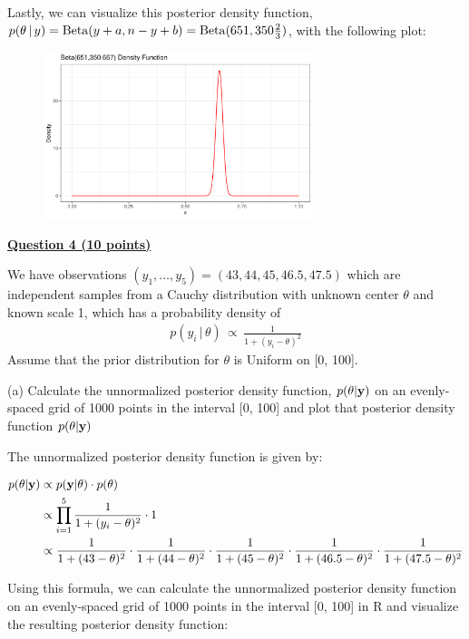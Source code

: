 \documentclass[12pt]{article}
\def\by{{\rm {\bf{y}}}}
\begin{document}
Lastly, we can visualize this posterior density function, $p(\theta \, | \, y) = {\rm Beta}(y + a, n - y + b) = {\rm Beta}(651, 350\frac{2}{3})$,
with the following plot:

\begin{figure}[h]
    \centering
    \includegraphics[width=0.7\textwidth]{q3b_plot.pdf}
\end{figure}

\bigskip

{\underline{\bf Question 4 (10 points)}}  

We have observations $(y_1,\ldots,y_5) = (43, 44, 45, 46.5, 47.5)$ which are independent samples from a Cauchy distribution with unknown center $\theta$ and known scale 1, which has a probability density of 
\begin{eqnarray*}
p(y_i \, | \, \theta) \, \propto \, \frac{1}{1 + (y_i - \theta)^2} 
\end{eqnarray*}
Assume that the prior distribution for $\theta$ is Uniform on [0, 100].  

(a) Calculate the unnormalized posterior density function, $p(\theta | \by)$ on an evenly-spaced grid of 1000 points in the interval [0, 100] and plot that posterior density function $p(\theta | \by)$

The unnormalized posterior density function is given by:

\begin{align*}
p(\theta | \by) &\propto p(\by | \theta) \cdot p(\theta) \\
&\propto \prod_{i=1}^5 \frac{1}{1 + (y_i - \theta)^2} \cdot 1 \\
&\propto \frac{1}{1 + (43 - \theta)^2} \cdot \frac{1}{1 + (44 - \theta)^2} \cdot \frac{1}{1 + (45 - \theta)^2} \cdot \frac{1}{1 + (46.5 - \theta)^2} \cdot \frac{1}{1 + (47.5 - \theta)^2} \\
\end{align*}

Using this formula, we can calculate the unnormalized posterior density function on an evenly-spaced grid of 1000 points in
the interval [0, 100] in R and visualize the resulting posterior density function:
\end{document}
